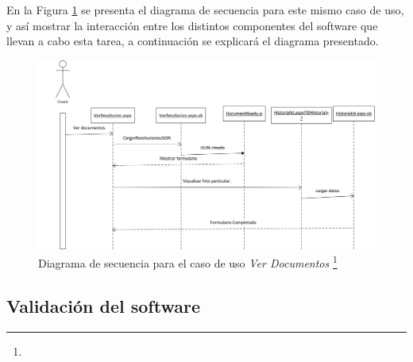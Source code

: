 	
	
			En la Figura \ref{diagrama_secuencial_ver_documento} se presenta el diagrama de secuencia para este mismo caso de uso, y así mostrar la interacción entre los distintos componentes del software que llevan a cabo esta tarea, a continuación se explicará el diagrama presentado.
			\begin{figure}[H]
				\centering
				\includegraphics[width=1\textwidth]{images/Capitulo_3/ver_Documentos.png}
				\caption[Diagrama de secuencia para el caso de uso \textit{Ver Documentos}]{Diagrama de secuencia para el caso de uso \textit{Ver Documentos} \footnote{}}
				\label{diagrama_secuencial_ver_documento}
			\end{figure}
			
			
\subsection{Validación del software}

